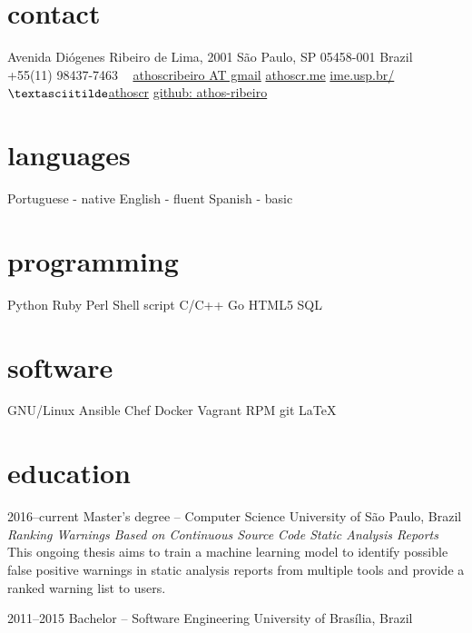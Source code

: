 \documentclass[]{friggeri-cv} %
\begin{document}


\begin{aside} %
\section{contact}
Avenida Diógenes Ribeiro de Lima, 2001
São Paulo, SP 05458-001
Brazil
~
+55(11) 98437-7463
~
\href{mailto:athoscribeiro@gmail.com}{athoscribeiro AT gmail}
\href{http://athoscr.me}{athoscr.me}
\href{https://www.ime.usp.br/~athoscr}{ime.usp.br/$\textasciitilde$athoscr}
\href{https://github.com/athos-ribeiro}{github: athos-ribeiro}
\section{languages}
Portuguese - native
English - fluent
Spanish - basic
\section{programming}
Python
Ruby
Perl
Shell script
C/C++
Go
HTML5
SQL
\section{software}
GNU/Linux
Ansible
Chef
Docker
Vagrant
RPM
git
\LaTeX
\end{aside}


\section{education}

\begin{entrylist}


\entry
{2016--current}
{Master's degree -- {\normalfont Computer Science}}
{University of São Paulo, Brazil}
  {\emph{Ranking Warnings Based on Continuous Source Code Static Analysis Reports} \\ This ongoing thesis aims to train a machine learning model to identify possible false positive warnings in static analysis reports from multiple tools and provide a ranked warning list to users.}


\entry
{2011--2015}
{Bachelor -- {\normalfont Software Engineering}}
{University of Brasília, Brazil}


\end{entrylist}
\end{document}
